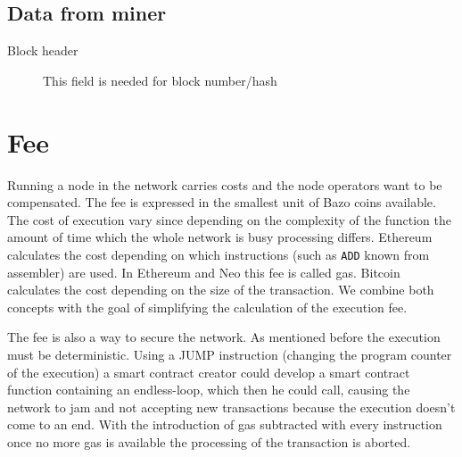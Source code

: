\subsection{Data from miner}
\begin{description}
  \item[Block header] This field is needed for block number/hash
\end{description}

\section{Fee} \label{fee}
Running a node in the network carries costs and the node operators want to be compensated. The fee is expressed in the smallest unit of Bazo coins available. The cost of execution vary since depending on the complexity of the function the amount of time which the whole network is busy processing differs. Ethereum calculates the cost depending on which instructions (such as \texttt{ADD} known from assembler) are used. In Ethereum and Neo this fee is called gas. Bitcoin calculates the cost depending on the size of the transaction. We combine both concepts with the goal of simplifying the calculation of the execution fee.

The fee is also a way to secure the network. As mentioned before the execution must be deterministic. Using a JUMP instruction (changing the program counter of the execution) a smart contract creator could develop a smart contract function containing an endless-loop, which then he could call, causing the network to jam and not accepting new transactions because the execution doesn't come to an end. With the introduction of gas subtracted with every instruction once no more gas is available the processing of the transaction is aborted.
